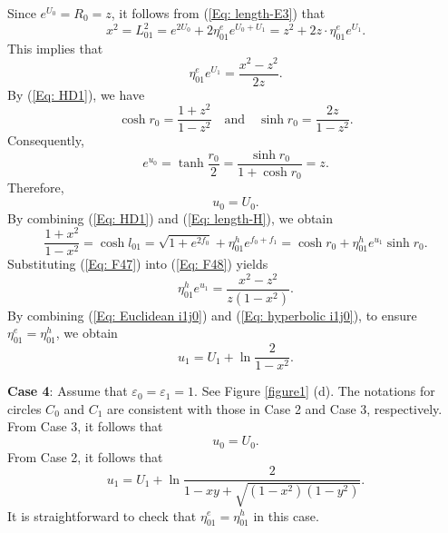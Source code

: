 \documentclass[12pt]{amsart}
\theoremstyle{definition}
\begin{document}
Since $e^{U_0}=R_0=z$, it follows from (\ref{Eq: length-E3}) that
\begin{equation*}
x^2=L_{01}^2
=e^{2U_0}+2\eta_{01}^ee^{U_0+U_1}
=z^2+2z\cdot \eta_{01}^ee^{U_1}.
\end{equation*}
This implies that
\begin{equation}\label{Eq: Euclidean i1j0}
\eta_{01}^ee^{U_1}=\frac{x^2-z^2}{2z}.
\end{equation}
By (\ref{Eq: HD1}), we have
\begin{equation}\label{Eq: F47}
\cosh r_0=\frac{1+z^2}{1-z^2}
\quad \text{and} \quad
\sinh r_0=\frac{2z}{1-z^2}.
\end{equation}
Consequently,
\begin{equation*}
e^{u_0}=\tanh \frac{r_0}{2}
=\frac{\sinh r_0}{1+\cosh r_0}
=z.
\end{equation*}
Therefore,
\begin{equation*}
u_0=U_0.
\end{equation*}
By combining (\ref{Eq: HD1}) and (\ref{Eq: length-H}), we obtain
\begin{equation}\label{Eq: F48}
\frac{1+x^2}{1-x^2}=\cosh l_{01}
=\sqrt{1+e^{2f_0}}
+\eta_{01}^he^{f_0+f_1}
=\cosh r_0+\eta_{01}^he^{u_1}\sinh r_0.
\end{equation}
Substituting (\ref{Eq: F47}) into (\ref{Eq: F48}) yields
\begin{equation}\label{Eq: hyperbolic i1j0}
\eta_{01}^he^{u_1}=\frac{x^2-z^2}{z(1-x^2)}.
\end{equation}
By combining (\ref{Eq: Euclidean i1j0}) and (\ref{Eq: hyperbolic i1j0}),
to ensure $\eta_{01}^e=\eta_{01}^h$, we obtain
\begin{equation*}
u_1=U_1+\ln \frac{2}{1-x^2}.
\end{equation*}


\textbf{Case 4}:
Assume that $\varepsilon_0=\varepsilon_1=1$.
See Figure \ref{figure1} (d).
The notations for circles $C_0$ and $C_1$ are consistent with those in Case 2 and Case 3, respectively.
From Case 3, it follows that
\begin{equation*}
u_0=U_0.
\end{equation*}
From Case 2, it follows that
\begin{equation*}
u_1=U_1+\ln \frac{2}{1-xy+\sqrt{(1-x^2)(1-y^2)}}.
\end{equation*}
It is straightforward to check that $\eta_{01}^e=\eta_{01}^h$ in this case.
\end{document}
